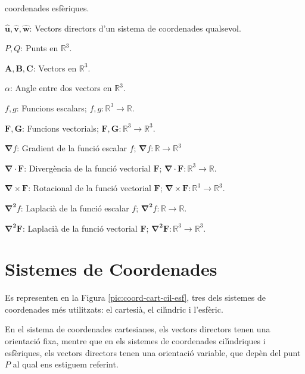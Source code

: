 \documentclass[catalan,a4paper,twoside,11pt]{article}
\begin{document}
\begin{list}{}
   coordenades esf\`{e}riques.
   \item[$\boldsymbol{\hat{u}},\boldsymbol{\hat{v}},\boldsymbol{\hat{w}}$:]
   Vectors directors d'un sistema de  coordenades
   qualsevol.
   \item[$P, Q$:] Punts en $\mathbb{R}^3$.
   \item[$\boldsymbol{A,B,C}$:] Vectors en $\mathbb{R}^3$.
   \item[$\alpha$:] Angle entre dos vectors en $\mathbb{R}^3$.
   \item[$f,g$:] Funcions escalars; $f,g: \mathbb{R}^3\rightarrow\mathbb{R}$.
   \item[$\boldsymbol{F,G}$:] Funcions vectorials; $\boldsymbol{F,G}:\mathbb{R}^3\rightarrow\mathbb{R}^3$.
   \item[$\boldsymbol{\nabla}f$:] Gradient de la funci\'{o} escalar $f$;
   $\boldsymbol{\nabla}f:\mathbb{R}\rightarrow\mathbb{R}^3$
   \item[$\boldsymbol{\nabla\cdot F}$:] Diverg\`{e}ncia de la funci\'{o} vectorial $\boldsymbol{F}$;
   $\boldsymbol{\nabla\cdot F}: \mathbb{R}^3\rightarrow\mathbb{R}$.
   \item[$\boldsymbol{\nabla\times F}$:] Rotacional de la funci\'{o} vectorial $\boldsymbol{F}$;
   $\boldsymbol{\nabla\times F}:
   \mathbb{R}^3\rightarrow\mathbb{R}^3$.
   \item[$\boldsymbol{\nabla^2}f$:] Laplaci\`{a} de la funci\'{o} escalar $f$;
   $\boldsymbol{\nabla^2}f: \mathbb{R}\rightarrow\mathbb{R}$.
   \item[$\boldsymbol{\nabla^2F}$:] Laplaci\`{a} de la funci\'{o} vectorial $\boldsymbol{F}$; $\boldsymbol{\nabla^2F}: \mathbb{R}^3\rightarrow\mathbb{R}^3$.
\end{list}

\newcommand{\va}{\ensuremath{\,\boldsymbol{\hat{x}}}}
\newcommand{\vb}{\ensuremath{\,\boldsymbol{\hat{y}}}}
\newcommand{\vc}{\ensuremath{\,\boldsymbol{\hat{z}}}}
\section{Sistemes de Coordenades}

Es representen en la Figura \vref{pic:coord-cart-cil-esf}, tres dels
sistemes de coordenades m\'{e}s utilitzats: el cartesi\`{a}, el
cil\'{\i}ndric i l'esf\`{e}ric.

En el sistema de coordenades cartesianes, els vectors directors
tenen una orientaci\'{o} fixa, mentre que en els sistemes de
coordenades cil\'{\i}ndriques i esf\`{e}riques, els vectors
directors tenen una orientaci\'{o} variable, que dep\`{e}n del punt
$P$ al qual ens estiguem referint.
\end{document}
